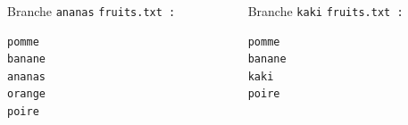 \documentclass[table,tikz,12pt,svgnames]{beamer}
\begin{document}
\begin{frame}[fragile]
\PAUSE


\begin{columns}[T] %
	\begin{column}{.45\textwidth}
		\color{darkgreen}
		Branche \texttt{ananas}
		\texttt{fruits.txt :}
		\color{black}
		\begin{verbatim}
pomme
banane
ananas
orange
poire
		\end{verbatim}
	\end{column}%
	\begin{column}{.45\textwidth}
		\color{blue}%
		Branche \texttt{kaki}
		\texttt{fruits.txt :}		
		\color{black}
\begin{verbatim}
pomme
banane
kaki
poire
\end{verbatim}
\end{column}%
\end{columns}
\end{frame}
\end{document}
